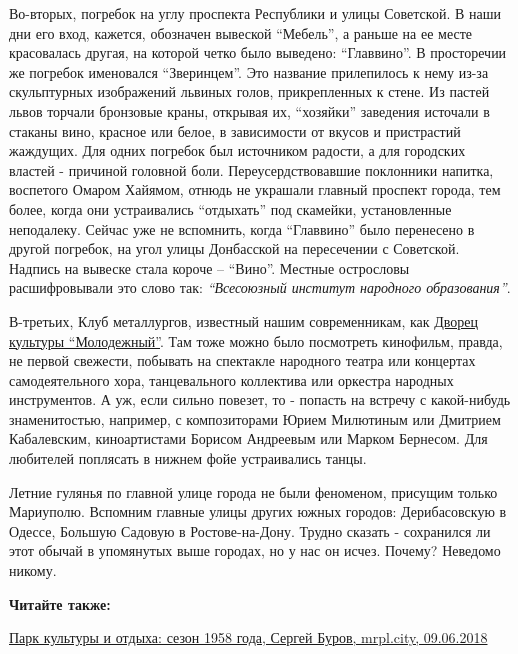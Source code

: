 Во-вторых, погребок на углу проспекта Республики и улицы Советской. В наши дни
его вход, кажется, обозначен вывеской \enquote{Мебель}, а раньше на ее месте
красовалась другая, на которой четко было выведено: \enquote{Главвино}. В просторечии
же погребок именовался \enquote{Зверинцем}. Это название прилепилось к нему из-за
скульптурных изображений львиных голов, прикрепленных к стене. Из пастей львов
торчали бронзовые краны, открывая их, \enquote{хозяйки} заведения источали в стаканы
вино, красное или белое, в зависимости от вкусов и пристрастий жаждущих. Для
одних погребок был источником радости, а для городских властей - причиной
головной боли. Переусердствовавшие поклонники напитка, воспетого Омаром
Хайямом, отнюдь не украшали главный проспект города, тем более, когда они
устраивались \enquote{отдыхать} под скамейки, установленные неподалеку. Сейчас уже не
вспомнить, когда \enquote{Главвино} было перенесено в другой погребок, на угол улицы
Донбасской на пересечении с Советской. Надпись на вывеске стала короче –
\enquote{Вино}. Местные острословы расшифровывали это слово так: \emph{\enquote{Всесоюзный институт
народного образования}}.

В-третьих, Клуб металлургов, известный нашим современникам, как \href{https://mrpl.city/blogs/dk-molodezhnyj}{Дворец культуры
\enquote{Молодежный}}. Там тоже можно было посмотреть кинофильм, правда, не первой
свежести, побывать на спектакле народного театра или концертах самодеятельного
хора, танцевального коллектива или оркестра народных инструментов. А уж, если
сильно повезет, то - попасть на встречу с какой-нибудь знаменитостью, например,
с композиторами Юрием Милютиным или Дмитрием Кабалевским, киноартистами Борисом
Андреевым или Марком Бернесом. Для любителей поплясать в нижнем фойе
устраивались танцы.

Летние гулянья по главной улице города не были феноменом, присущим только
Мариуполю. Вспомним главные улицы других южных городов: Дерибасовскую в Одессе,
Большую Садовую в Ростове-на-Дону. Трудно сказать - сохранился ли этот обычай в
упомянутых выше городах, но у нас он исчез. Почему? Неведомо никому.

\vspace{0.5cm}
\begin{minipage}{0.9\textwidth}
\textbf{Читайте также:} 
	
\href{https://archive.org/details/09_06_2018.sergij_burov.mrpl_city.park_kultury_i_otdyha_sezon_1958_goda}{Парк культуры и отдыха: сезон 1958 года, Сергей Буров, mrpl.city, 09.06.2018}
\end{minipage}
\vspace{0.5cm}

